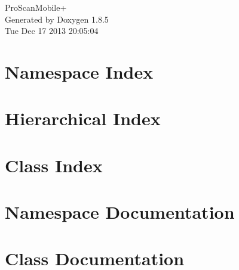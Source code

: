 \documentclass[twoside]{book}
\newcommand{\clearemptydoublepage}{%
  \newpage{\pagestyle{empty}\cleardoublepage}%
}
\begin{document}
\hypersetup{pageanchor=false}
\begin{titlepage}
\vspace*{7cm}
\begin{center}%
{\Large Pro\-Scan\-Mobile+ }\\
\vspace*{1cm}
{\large Generated by Doxygen 1.8.5}\\
\vspace*{0.5cm}
{\small Tue Dec 17 2013 20:05:04}\\
\end{center}
\end{titlepage}
\clearemptydoublepage
\tableofcontents
\clearemptydoublepage
{}
\hypersetup{pageanchor=true}

\chapter{Namespace Index}

\chapter{Hierarchical Index}

\chapter{Class Index}

\chapter{Namespace Documentation}

\chapter{Class Documentation}























\newpage
{}
{}
\printindex
\end{document}
